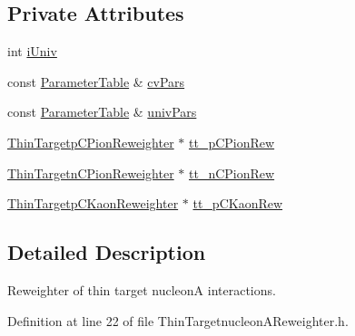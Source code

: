 \subsection*{Private Attributes}
\begin{DoxyCompactItemize}
\item 
int \hyperlink{class_neutrino_flux_reweight_1_1_thin_targetnucleon_a_reweighter_a546b2c322fe357472e17a4a901bd2212}{i\-Univ}
\item 
const \hyperlink{class_neutrino_flux_reweight_1_1_parameter_table}{Parameter\-Table} \& \hyperlink{class_neutrino_flux_reweight_1_1_thin_targetnucleon_a_reweighter_aa2690e0e126d75bbcb68ec28c8c4811a}{cv\-Pars}
\item 
const \hyperlink{class_neutrino_flux_reweight_1_1_parameter_table}{Parameter\-Table} \& \hyperlink{class_neutrino_flux_reweight_1_1_thin_targetnucleon_a_reweighter_a56d10ce15819c77e9d4a6538f403b71e}{univ\-Pars}
\item 
\hyperlink{class_neutrino_flux_reweight_1_1_thin_targetp_c_pion_reweighter}{Thin\-Targetp\-C\-Pion\-Reweighter} $\ast$ \hyperlink{class_neutrino_flux_reweight_1_1_thin_targetnucleon_a_reweighter_a0a172e21c2229793a1cc8c02bd91a10c}{tt\-\_\-p\-C\-Pion\-Rew}
\item 
\hyperlink{class_neutrino_flux_reweight_1_1_thin_targetn_c_pion_reweighter}{Thin\-Targetn\-C\-Pion\-Reweighter} $\ast$ \hyperlink{class_neutrino_flux_reweight_1_1_thin_targetnucleon_a_reweighter_ae21cb01b4e98a9d57dc4f4f61a331b1c}{tt\-\_\-n\-C\-Pion\-Rew}
\item 
\hyperlink{class_neutrino_flux_reweight_1_1_thin_targetp_c_kaon_reweighter}{Thin\-Targetp\-C\-Kaon\-Reweighter} $\ast$ \hyperlink{class_neutrino_flux_reweight_1_1_thin_targetnucleon_a_reweighter_afd58d88fc30de67bd41956efb17bd303}{tt\-\_\-p\-C\-Kaon\-Rew}
\end{DoxyCompactItemize}


\subsection{Detailed Description}
Reweighter of thin target nucleon\-A interactions. 

Definition at line 22 of file Thin\-Targetnucleon\-A\-Reweighter.\-h.



